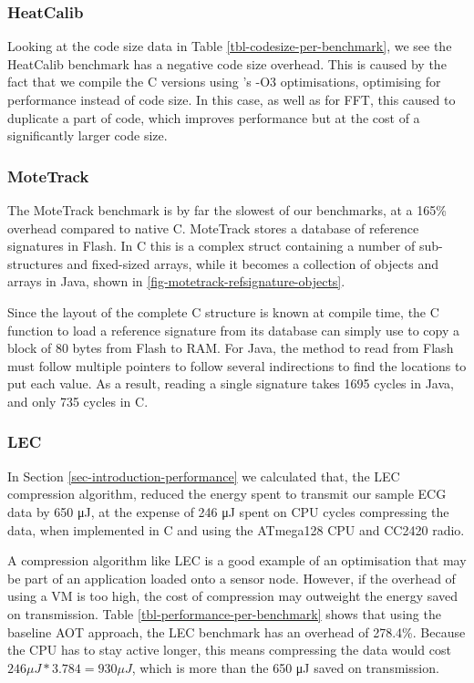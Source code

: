\subsubsection{HeatCalib}
Looking at the code size data in Table \ref{tbl-codesize-per-benchmark}, we see the HeatCalib benchmark has a negative code size overhead. This is caused by the fact that we compile the C versions using 's -O3 optimisations, optimising for performance instead of code size. In this case, as well as for FFT, this caused  to duplicate a part of code, which improves performance but at the cost of a significantly larger code size.

\subsubsection{MoteTrack}
The MoteTrack benchmark is by far the slowest of our benchmarks, at a 165\% overhead compared to native C. MoteTrack stores a database of reference signatures in Flash. In C this is a complex struct containing a number of sub-structures and fixed-sized arrays, while it becomes a collection of objects and arrays in Java, shown in \ref{fig-motetrack-refsignature-objects}.

Since the layout of the complete C structure is known at compile time, the C function to load a reference signature from its database can simply use  to copy a block of 80 bytes from Flash to RAM. For Java, the method to read from Flash must follow multiple pointers to follow several indirections to find the locations to put each value. As a result, reading a single signature takes 1695 cycles in Java, and only 735 cycles in C.

\subsubsection{LEC}
In Section \ref{sec-introduction-performance} we calculated that, the LEC compression algorithm, reduced the energy spent to transmit our sample ECG data by 650 μJ, at the expense of 246 μJ spent on CPU cycles compressing the data, when implemented in C and using the ATmega128 CPU and CC2420 radio.

A compression algorithm like LEC is a good example of an optimisation that may be part of an application loaded onto a sensor node. However, if the overhead of using a VM is too high, the cost of compression may outweight the energy saved on transmission. Table \ref{tbl-performance-per-benchmark} shows that using the baseline AOT approach, the LEC benchmark has an overhead of 278.4\%. Because the CPU has to stay active longer, this means compressing the data would cost $246 \mu J * 3.784 = 930 \mu J$, which is more than the 650 μJ saved on transmission.

